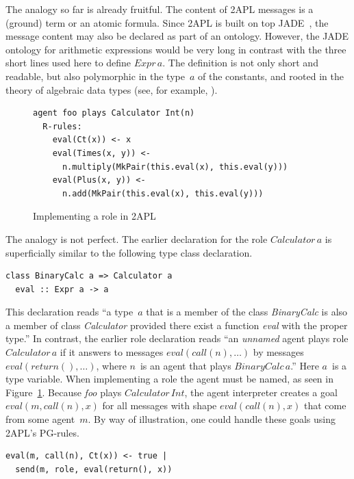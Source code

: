 \documentclass[a4paper,12pt,oneside,fleqn]{book} %
\begin{document}
{The analogy so far is already fruitful. The content of 2APL messages is a
(ground) term or an atomic formula. Since 2APL is built on top
JADE~\cite{DBLP:books/sp/map2005/BellifemineBCP05}, the message content may
also be declared as part of an ontology. However, the JADE ontology for
arithmetic expressions would be very long in contrast with the three short
lines used here to define $\mathit{Expr}\,a$. The definition is not only
short and readable, but also polymorphic in the type~$a$ of the constants,
and rooted in the theory of algebraic data types (see, for example,
\cite{DBLP:conf/ctcs/Hagino87}).

\begin{figure}\footnotesize %
\begin{verbatim}
agent foo plays Calculator Int(n)
  R-rules:
    eval(Ct(x)) <- x
    eval(Times(x, y)) <-
      n.multiply(MkPair(this.eval(x), this.eval(y)))
    eval(Plus(x, y)) <-
      n.add(MkPair(this.eval(x), this.eval(y)))
\end{verbatim}
\caption{Implementing a role in 2APL}\label{fig:roleimpl2APL}
\end{figure} %

The analogy is not perfect. The earlier declaration for the role
$\mathit{Calculator}\,a$ is superficially similar to the following type
class declaration.
\begin{verbatim}
class BinaryCalc a => Calculator a
  eval :: Expr a -> a
\end{verbatim}

This declaration reads ``a type~$a$ that is a member of the class
\textit{BinaryCalc} is also a member of class \textit{Calculator} provided
there exist a function \textit{eval} with the proper type.'' In contrast,
the earlier role declaration reads ``an \emph{unnamed} agent plays role
$\mathit{Calculator}\,a$ if it answers to messages
$\mathit{eval}(\mathit{call}(n),\ldots)$ by messages
$\mathit{eval}(\mathit{return}(),\ldots)$, where $n$~is an agent that plays
$\mathit{BinaryCalc}\,a$.'' Here $a$~is a type variable.  When implementing
a role the agent must be named, as seen in Figure~\ref{fig:roleimpl2APL}.
Because \textit{foo} plays $\mathit{Calculator}\,\mathit{Int}$, the agent
interpreter creates a goal $\mathit{eval}(m,\mathit{call}(n),x)$ for all
messages with shape $\mathit{eval}(\mathit{call}(n),x)$ that come from some
agent~$m$. By way of illustration, one could handle these goals using 2APL's PG-rules.

\begin{verbatim}
eval(m, call(n), Ct(x)) <- true |
  send(m, role, eval(return(), x))
\end{verbatim}

}
\end{document}
